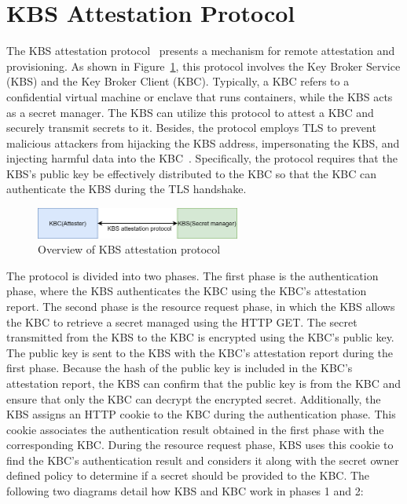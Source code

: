 \section{KBS Attestation Protocol}
\label{sec:kbs}





The KBS attestation protocol~\cite*{kbs_Attestation_protocol}  presents a mechanism for remote attestation and provisioning. As shown in Figure~\ref{fig:kbs_overwiev}, this protocol involves the Key Broker Service (\acrshort{KBS}) and the Key Broker Client (\acrshort{KBC}). Typically, a \acrshort{KBC} refers to a confidential virtual machine or enclave that runs containers, while the 
\acrshort{KBS} acts as a secret manager. The KBS can utilize this protocol to attest a KBC and securely transmit secrets to it. Besides, the protocol employs TLS\cite*{tls_record_size} to prevent malicious attackers 
from hijacking the \acrshort{KBS} address,  impersonating the \acrshort{KBS},  and injecting harmful data into the \acrshort{KBC}~\cite*{kbs_Attestation_protocol}. Specifically, the protocol requires that the \acrshort{KBS}'s public key be effectively distributed to the \acrshort{KBC} so 
that the \acrshort{KBC} can authenticate the \acrshort{KBS} during the TLS handshake.
\begin{figure}[htp]
  \centering
  \includegraphics[width=0.6\textwidth]{images/kbs_overwiev.png}
  \caption[Overview of KBS attestation protocol]{Overview of KBS attestation protocol}
  \label{fig:kbs_overwiev}
\end{figure}


The protocol is divided into two phases. The first phase is the authentication phase, where the \acrshort{KBS} authenticates the \acrshort{KBC} using the \acrshort{KBC}'s attestation report. The second phase is the resource request phase, in which the \acrshort{KBS} allows the \acrshort{KBC} to retrieve a secret managed using the HTTP GET.  
The secret transmitted from the \acrshort{KBS} to the \acrshort{KBC} is encrypted using the \acrshort{KBC}'s public key. The public key is sent to the \acrshort{KBS} with the \acrshort{KBC}'s attestation report during the first phase. Because the hash of the public key is included in the \acrshort{KBC}'s attestation report, the \acrshort{KBS} can confirm that the public key is from the \acrshort{KBC} and ensure that only the \acrshort{KBC} can decrypt the encrypted secret. Additionally, the \acrshort{KBS} assigns an HTTP cookie to the \acrshort{KBC} during the authentication phase. This cookie associates the authentication result obtained in the first phase with the corresponding \acrshort{KBC}. During the resource 
request phase, \acrshort{KBS} uses this cookie to find the \acrshort{KBC}'s authentication result and considers it along with the secret owner defined policy to determine if a secret should be provided to the \acrshort{KBC}. The following two diagrams detail how \acrshort{KBS} and \acrshort{KBC} work in phases 1 and 2:


